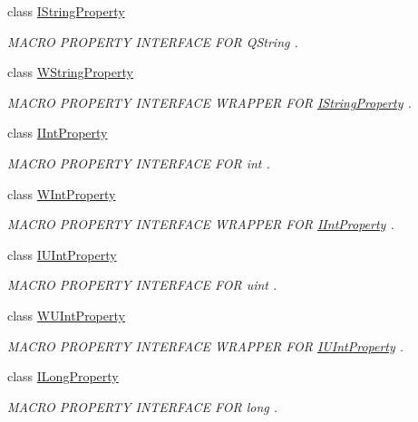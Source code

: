 \begin{DoxyCompactItemize}
class \hyperlink{class_i_string_property}{I\-String\-Property}
\begin{DoxyCompactList}\small\item\em M\-A\-C\-R\-O P\-R\-O\-P\-E\-R\-T\-Y I\-N\-T\-E\-R\-F\-A\-C\-E F\-O\-R Q\-String . \end{DoxyCompactList}\item 
class \hyperlink{class_w_string_property}{W\-String\-Property}
\begin{DoxyCompactList}\small\item\em M\-A\-C\-R\-O P\-R\-O\-P\-E\-R\-T\-Y I\-N\-T\-E\-R\-F\-A\-C\-E W\-R\-A\-P\-P\-E\-R F\-O\-R \hyperlink{class_i_string_property}{I\-String\-Property} . \end{DoxyCompactList}\item 
class \hyperlink{class_i_int_property}{I\-Int\-Property}
\begin{DoxyCompactList}\small\item\em M\-A\-C\-R\-O P\-R\-O\-P\-E\-R\-T\-Y I\-N\-T\-E\-R\-F\-A\-C\-E F\-O\-R int . \end{DoxyCompactList}\item 
class \hyperlink{class_w_int_property}{W\-Int\-Property}
\begin{DoxyCompactList}\small\item\em M\-A\-C\-R\-O P\-R\-O\-P\-E\-R\-T\-Y I\-N\-T\-E\-R\-F\-A\-C\-E W\-R\-A\-P\-P\-E\-R F\-O\-R \hyperlink{class_i_int_property}{I\-Int\-Property} . \end{DoxyCompactList}\item 
class \hyperlink{class_i_u_int_property}{I\-U\-Int\-Property}
\begin{DoxyCompactList}\small\item\em M\-A\-C\-R\-O P\-R\-O\-P\-E\-R\-T\-Y I\-N\-T\-E\-R\-F\-A\-C\-E F\-O\-R uint . \end{DoxyCompactList}\item 
class \hyperlink{class_w_u_int_property}{W\-U\-Int\-Property}
\begin{DoxyCompactList}\small\item\em M\-A\-C\-R\-O P\-R\-O\-P\-E\-R\-T\-Y I\-N\-T\-E\-R\-F\-A\-C\-E W\-R\-A\-P\-P\-E\-R F\-O\-R \hyperlink{class_i_u_int_property}{I\-U\-Int\-Property} . \end{DoxyCompactList}\item 
class \hyperlink{class_i_long_property}{I\-Long\-Property}
\begin{DoxyCompactList}\small\item\em M\-A\-C\-R\-O P\-R\-O\-P\-E\-R\-T\-Y I\-N\-T\-E\-R\-F\-A\-C\-E F\-O\-R long . \end{DoxyCompactList}\item 

\end{DoxyCompactItemize}
